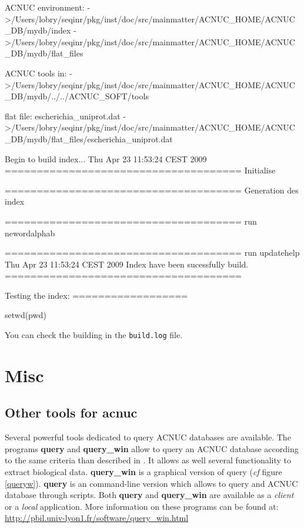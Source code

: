 \documentclass{article}
\begin{document}
\begin{itemize}
\begin{Schunk}
\begin{Soutput}
ACNUC environment:
 ->/Users/lobry/seqinr/pkg/inst/doc/src/mainmatter/ACNUC_HOME/ACNUC_DB/mydb/index
 ->/Users/lobry/seqinr/pkg/inst/doc/src/mainmatter/ACNUC_HOME/ACNUC_DB/mydb/flat_files
 
ACNUC tools in:
 ->/Users/lobry/seqinr/pkg/inst/doc/src/mainmatter/ACNUC_HOME/ACNUC_DB/mydb/../../ACNUC_SOFT/tools
 
flat file: escherichia_uniprot.dat
 ->/Users/lobry/seqinr/pkg/inst/doc/src/mainmatter/ACNUC_HOME/ACNUC_DB/mydb/flat_files/escherichia_uniprot.dat
 
Begin to build index...
Thu Apr 23 11:53:24 CEST 2009
=====================================
Initialise

=====================================
Generation des index

=====================================
run newordalphab


=====================================
run updatehelp
Thu Apr 23 11:53:24 CEST 2009
Index have been sucessfully build.
=====================================
 
Testing the index:
==================
\end{Soutput}
\begin{Sinput}
 setwd(pwd)
\end{Sinput}
\end{Schunk}
You can check the building in the \texttt{build.log} file.

\end{itemize}




\section{Misc} 

\subsection{Other tools for acnuc}

Several powerful tools dedicated to query ACNUC databases are available. 
The programs \textbf{query} and \textbf{query\_win} allow to query an ACNUC database according to the same
criteria than described  in \seqinr{}. It allows as well several functionality to extract biological data.
\textbf{query\_win} is a graphical version of query (\textit{cf} figure \ref{queryw}).
\textbf{query} is an command-line version which allows to query and ACNUC database through scripts.
Both \textbf{query} and  \textbf{query\_win} are available as a
\textit{client} or a \textit{local} application. More information on these programs can be found at:
\url{http://pbil.univ-lyon1.fr/software/query_win.html}
\end{document}
